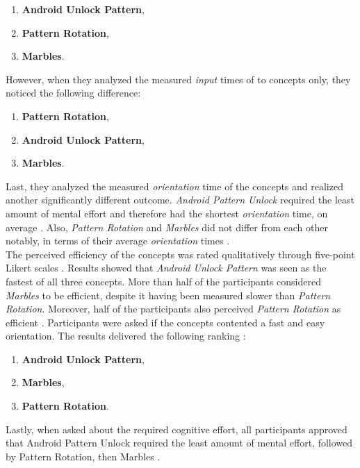 \begin{enumerate}
    \item \textbf{Android Unlock Pattern},
    \item \textbf{Pattern Rotation},
    \item \textbf{Marbles}.
\end{enumerate} 

However, when they analyzed the measured \textit{input} times of to concepts only, they noticed the following difference:

\begin{enumerate}
    \item \textbf{Pattern Rotation},
    \item \textbf{Android Unlock Pattern},
    \item \textbf{Marbles}.
\end{enumerate}

Last, they analyzed the measured \textit{orientation} time of the concepts and realized another significantly different outcome. \textit{Android Pattern Unlock} required the least amount of mental effort and therefore had the shortest \textit{orientation} time, on average \cite{anonymous}. Also, \textit{Pattern Rotation} and \textit{Marbles} did not differ from each other notably, in terms of their average \textit{orientation} times \cite{anonymous}. \\
The perceived efficiency of the concepts was rated qualitatively through five-point Likert scales \cite{anonymous}. Results showed that \textit{Android Unlock Pattern} was seen as the fastest of all three concepts. More than half of the participants considered \textit{Marbles} to be efficient, despite it having been measured slower than \textit{Pattern Rotation}. Moreover, half of the participants also perceived \textit{Pattern Rotation} as efficient \cite{anonymous}. Participants were asked if the concepts contented a fast and easy orientation. The results delivered the following ranking \cite{anonymous}: 

\begin{enumerate}
     \item \textbf{Android Unlock Pattern},
    \item \textbf{Marbles},
    \item \textbf{Pattern Rotation}.
\end{enumerate}

Lastly, when asked about the required cognitive effort, all participants approved that Android Pattern Unlock required the least amount of mental effort, followed by Pattern Rotation, then Marbles \cite{anonymous}. \\

